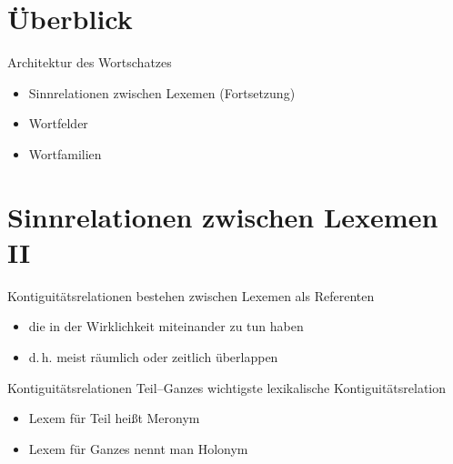 \section{Überblick}

\begin{frame}{Architektur des Wortschatzes}
\onslide<+->
\begin{itemize}[<+->]
  \item Sinnrelationen zwischen Lexemen (Fortsetzung)
	\item	Wortfelder
	\item	Wortfamilien
\end{itemize}
 \end{frame}


\section[Sinnrelationen II]{Sinnrelationen zwischen Lexemen II}

\begin{frame}{Kontiguitätsrelationen}
\onslide<+->
bestehen zwischen Lexemen als Referenten
\begin{itemize}[<+->]
	\item		die in der Wirklichkeit miteinander zu tun haben
	\item		d.\,h. meist räumlich oder zeitlich überlappen
\end{itemize}
\onslide<+->
\Zeile
\begin{exe}
	\ex\label{ex:kontiguitaetsrelationen-001}
    \begin{xlist}
		\onslide<+->
		\onslide<+->
	\end{xlist}
\end{exe}
\end{frame}

\begin{frame}{Kontiguitätsrelationen}
\onslide<+->
Teil–Ganzes wichtigste lexikalische Kontiguitätsrelation
\begin{itemize}[<+->]
	\item		Lexem für Teil heißt Meronym
	\item		Lexem für Ganzes nennt man Holonym
\end{itemize}
\onslide<+->
\Zeile
\begin{exe}
	\ex\label{ex:kontiguitaetsrelationen-002}
    \begin{xlist}
		\onslide<+->
		\onslide<+->
		\onslide<+->
	\end{xlist}
\end{exe}
\end{frame}

